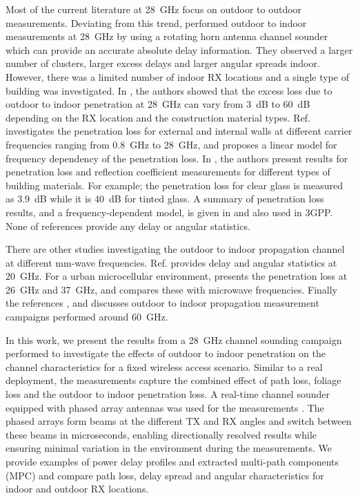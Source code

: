 \documentclass[conference]{IEEEtran}
\begin{document}
Most of the current literature at \SI{28}{GHz} focus on outdoor to outdoor measurements. Deviating from this trend, \cite{Ko_2016_feasibility} performed outdoor to indoor measurements at \SI{28}{GHz} by using a rotating horn antenna channel sounder which can provide an accurate absolute delay information. They observed a larger number of clusters, larger excess delays and larger angular spreads indoor. However, there was a limited number of indoor RX locations and a single type of building was investigated. In \cite{larsson_2014_outdoor}, the authors showed that the excess loss due to outdoor to indoor penetration at \SI{28}{GHz} can vary from \SI{3}{dB} to \SI{60}{dB} depending on the RX location and the construction material types. Ref. \cite{rodriguez_2017_empirical} investigates the penetration loss for external and internal walls at different carrier frequencies ranging from \SI{0.8}{GHz} to \SI{28}{GHz}, and proposes a linear model for frequency dependency of the penetration loss. In \cite{zhao_2013_28GHz}, the authors present results for penetration loss and reflection coefficient measurements for different types of building materials. For example; the penetration loss for clear glass is measured as \SI{3.9}{dB} while it is \SI{40}{dB} for tinted glass. A summary of penetration loss results, and a frequency-dependent model, is given in \cite{haneda20165g} and also used in 3GPP. None of references \cite{larsson_2014_outdoor, rodriguez_2017_empirical, zhao_2013_28GHz, haneda20165g}  provide any delay or angular statistics.

There are other studies investigating the outdoor to indoor propagation channel at different mm-wave frequencies. Ref. \cite{tra_2016_outdoor} provides delay and angular statistics at \SI{20}{GHz}. For a urban microcellular environment, \cite{imai_2016_outdoor} presents the penetration loss at \SI{26}{GHz} and \SI{37}{GHz}, and compares these with microwave frequencies. Finally the references \cite{kim_2016_mmwave}, \cite{Cheng_2016_study} and \cite{Diakhate_2017_millimeter} discusses outdoor to indoor propagation measurement campaigns performed around \SI{60}{GHz}.

In this work, we present the results from a \SI{28}{GHz} channel sounding campaign performed to investigate the effects of outdoor to indoor penetration on the channel characteristics for a fixed wireless access scenario. Similar to a real deployment, the measurements capture the combined effect of path loss, foliage loss and the outdoor to indoor penetration loss. A real-time channel sounder equipped with phased array antennas was used for the measurements \cite{bas_2017_realtime}. The phased arrays form beams at the different TX and RX angles and switch between these beams in microseconds, enabling directionally resolved results while ensuring minimal variation in the environment during the measurements. We provide examples of power delay profiles and extracted multi-path components (MPC) and compare path loss, delay spread and angular characteristics for indoor and outdoor RX locations. 
\end{document}
